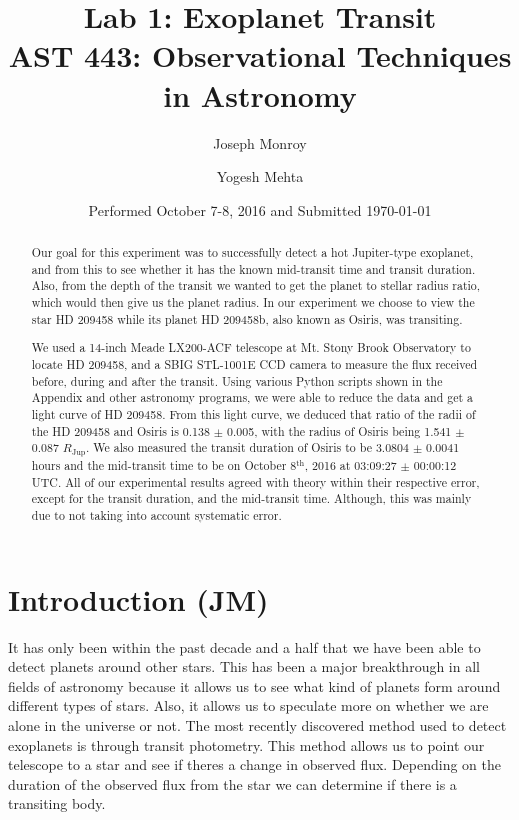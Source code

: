 \documentclass{aastex61}
\begin{document}
\title{Lab 1: Exoplanet Transit \\ AST 443: Observational Techniques in Astronomy}

\date{Performed October 7-8, 2016 and Submitted \today}

\author{Joseph Monroy}

\author{Yogesh Mehta}


\begin{abstract}
Our goal for this experiment was to successfully detect a hot Jupiter-type exoplanet, and from this to see whether it has the known mid-transit time and transit duration. Also, from the depth of the transit we wanted to get the planet to stellar radius ratio, which would then give us the planet radius. In our experiment we choose to view the star HD 209458 while its planet HD 209458b, also known as Osiris, was transiting. 

We used a 14-inch Meade LX200-ACF telescope at Mt. Stony Brook Observatory to locate HD 209458, and a SBIG STL-1001E CCD camera to measure the flux received before, during and after the transit. Using various Python scripts shown in the Appendix and other astronomy programs, we were able to reduce the data and get a light curve of HD 209458. From this light curve, we deduced that ratio of the radii of the HD 209458 and Osiris is 0.138 $\pm$ 0.005, with the radius of Osiris being 1.541 $\pm$ 0.087 $R_{\text{Jup}}$. We also measured the transit duration of Osiris to be 3.0804 $\pm$ 0.0041 hours and the mid-transit time to be on October 8$^{\text{th}}$, 2016 at 03:09:27 $\pm$ 00:00:12 UTC. All of our experimental results agreed with theory within their respective error, except for the transit duration, and the mid-transit time. Although, this was mainly due to not taking into account systematic error.
\end{abstract}

\section{Introduction (JM)} \label{sec:intro}
It has only been within the past decade and a half that we have been able to detect planets around other stars. This has been a major breakthrough in all fields of astronomy because it allows us to see what kind of planets form around different types of stars. Also, it allows us to speculate more on whether we are alone in the universe or not. The most recently discovered method used to detect exoplanets is through transit photometry. This method allows us to point our telescope to a star and see if theres a change in observed flux. Depending on the duration of the observed flux from the star we can determine if there is a transiting body. 
\end{document}
